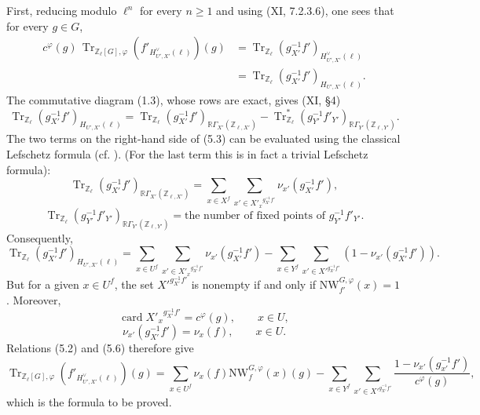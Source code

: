 \documentclass[11pt]{article}
\providecommand{\Tr}{\operatorname{Tr}}
\providecommand{\Tr}{\operatorname{Tr}}
\providecommand{\Tr}{\operatorname{Tr}}
\providecommand{\Tr}{\operatorname{Tr}}
\providecommand{\bZ}{\mathbb Z}
\providecommand{\card}{\operatorname{card}}
\providecommand{\Tr}{\operatorname{Tr}}
\begin{document}
First, reducing modulo $\ell^n$ for every $n\ge1$ and using (XI, 7.2.3.6), one sees that for every $g\in G$,
\begin{equation}\tag{5.2}
\begin{aligned}
c^\varphi(g)\,\Tr_{\bZ_\ell[G],\varphi}(f'_{H^\vee_{U',X'}(\ell)})(g)
&=\Tr_{\bZ_\ell}(g_{X'}^{-1}f')_{H^\vee_{U',X'}(\ell)}\\
&=\Tr_{\bZ_\ell}(g_{X'}^{-1}f')_{H_{U',X'}(\ell)}.
\end{aligned}
\end{equation}
The commutative diagram (1.3), whose rows are exact, gives (XI, \S4)
\begin{equation}\tag{5.3}
\Tr_{\bZ_\ell}(g_{X'}^{-1}f')_{H_{U',X'}(\ell)}
=\Tr_{\bZ_\ell}(g_{X'}^{-1}f')_{\mathbb{R}\Gamma_{X'}(\bZ_{\ell,X'})}
-\Tr^*_{\bZ_\ell}(g_{Y'}^{-1}f'_{Y'})_{\mathbb{R}\Gamma_{Y'}(\bZ_{\ell,Y'})}.
\end{equation}
The two terms on the right-hand side of (5.3) can be evaluated using the classical Lefschetz formula (cf. ). (For the last term this is in fact a trivial Lefschetz formula):
\begin{equation}\tag{5.4}
\Tr_{\bZ_\ell}(g_{X'}^{-1}f')_{\mathbb{R}\Gamma_{X'}(\bZ_{\ell,X'})}
=\sum_{x\in X^f}\sum_{x'\in {X'_x}^{g_{X'}^{-1}f'}}\nu_{x'}(g_{X'}^{-1}f'),
\end{equation}
\begin{equation}\tag{5.5}
\Tr_{\bZ_\ell}(g_{Y'}^{-1}f'_{Y'})_{\mathbb{R}\Gamma_{Y'}(\bZ_{\ell,Y'})}
=\text{the number of fixed points of }g_{Y'}^{-1}f'_{Y'}.
\end{equation}
Consequently,
\begin{equation}\tag{5.6}
\Tr_{\bZ_\ell}(g_{X'}^{-1}f')_{H_{U',X'}(\ell)}
=\sum_{x\in U^f}\sum_{x'\in {X'_x}^{g_{X'}^{-1}f'}}\nu_{x'}(g_{X'}^{-1}f')
-\sum_{x\in Y^f}\sum_{x'\in {X'}^{g_{X'}^{-1}f'}}(1-\nu_{x'}(g_{X'}^{-1}f')).
\end{equation}
But for a given $x\in U^f$, the set ${X'}^{g_{X'}^{-1}f'}$ is nonempty if and only if $\mathrm{NW}_{f'}^{G,\varphi}(x)=1$. Moreover,
\begin{equation}\tag{5.7}
\card {X'_x}^{g_{X'}^{-1}f'}=c^\varphi(g),
\qquad x\in U,
\end{equation}
\begin{equation}\tag{5.8}
\nu_{x'}(g_{X'}^{-1}f')=\nu_x(f),
\qquad x\in U.
\end{equation}
Relations (5.2) and (5.6) therefore give
\begin{equation}\tag{5.9}
\Tr_{\bZ_\ell[G],\varphi}(f'_{H^\vee_{U',X'}(\ell)})(g)
=\sum_{x\in U^f}\nu_x(f)\mathrm{NW}_f^{G,\varphi}(x)(g)
-\sum_{x\in Y^f}\sum_{x'\in {X'}^{g_{X'}^{-1}f'}}
\frac{1-\nu_{x'}(g_{x'}^{-1}f')}{c^\varphi(g)},
\end{equation}
which is the formula to be proved.
\end{document}
